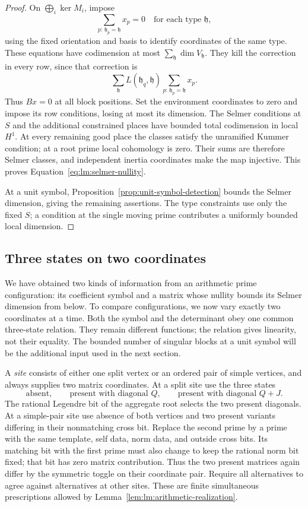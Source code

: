\begin{proof}
On $\bigoplus_i\ker M_i$, impose
\begin{equation}\label{eq:lm:type-sums}
 \sum_{p:\,\mathfrak h_p=\mathfrak h}x_p=0
 \quad\text{for each type }\mathfrak h,
\end{equation}
using the fixed orientation and basis to identify coordinates of the
same type. These equations have codimension at most
$\sum_{\mathfrak h}\dim V_{\mathfrak h}$. They kill the correction
in every row, since that correction is
\[
 \sum_{\mathfrak h}L(\mathfrak h_q,\mathfrak h)
       \sum_{p:\,\mathfrak h_p=\mathfrak h}x_p.
\]
Thus $Bx=0$ at all block positions. Set the environment coordinates
to zero and impose its row conditions, losing at most its dimension.
The Selmer conditions at $S$ and the additional constrained places
have bounded total codimension in local $H^1$. At every remaining
good place the classes satisfy the unramified Kummer condition; at a
root prime local cohomology is zero. Their sums are therefore Selmer
classes, and independent inertia coordinates make the map injective.
This proves Equation~\eqref{eq:lm:selmer-nullity}.

At a unit symbol, Proposition~\ref{prop:unit-symbol-detection} bounds
the Selmer dimension, giving the remaining assertions. The type
constraints use only the fixed $S$; a condition at the single moving
prime contributes a uniformly bounded local dimension.
\end{proof}

\subsection{Three states on two coordinates}

We have obtained two kinds of information from an arithmetic prime
configuration: its coefficient symbol and a matrix whose nullity
bounds its Selmer dimension from below. To compare configurations,
we now vary exactly two coordinates at a time. Both the symbol and
the determinant obey one common three-state relation. They remain
different functions; the relation gives linearity, not their equality.
The bounded number of singular blocks at a unit symbol will be the
additional input used in the next section.

A \emph{site} consists of either one split vertex or an ordered pair
of simple vertices, and always supplies two matrix coordinates.
At a split site use the three states
\[
 \text{absent},\qquad
 \text{present with diagonal }Q,\qquad
 \text{present with diagonal }Q+J.
\]
The rational Legendre bit of the aggregate root selects the two
present diagonals. At a simple-pair site use absence of both vertices
and two present variants differing in their nonmatching cross bit.
Replace the second prime by a prime with the same template, self data,
norm data, and outside cross bits. Its matching bit with the first
prime must also change to keep the rational norm bit fixed; that bit
has zero matrix contribution. Thus the two present matrices again
differ by the symmetric toggle on their coordinate pair. Require all
alternatives to agree against alternatives at other sites. These are
finite simultaneous prescriptions allowed by
Lemma~\ref{lem:lm:arithmetic-realization}.

